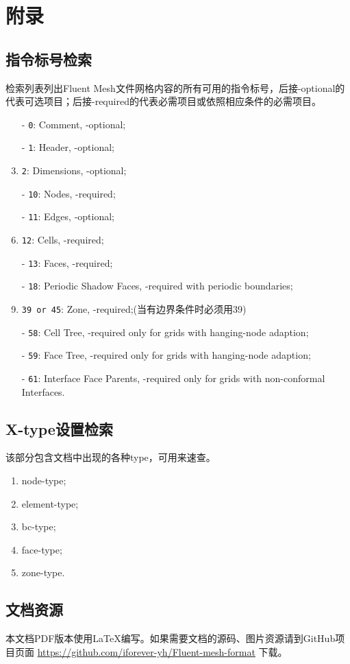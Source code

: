 \documentclass[lang=cn,11pt,a4paper]{elegantpaper} %
\begin{document}
\section{附录}

\subsection{指令标号检索}\label{index}
检索列表列出Fluent Mesh文件网格内容的所有可用的指令标号，后接-optional的代表可选项目；后接-required的代表必需项目或依照相应条件的必需项目。
\begin{enumerate}
  \item[-] \lstinline{0}: Comment, -optional;
  \item[-] \lstinline{1}: Header, -optional;
  \item[-] \lstinline{2}: Dimensions, -optional;
  \item[-] \lstinline{10}: Nodes, -required;
  \item[-] \lstinline{11}: Edges, -optional;
  \item[-] \lstinline{12}: Cells, -required;
  \item[-] \lstinline{13}: Faces, -required;
  \item[-] \lstinline{18}: Periodic Shadow Faces, -required with periodic boundaries;
  \item[-] \lstinline{39 or 45}: Zone, -required;(当有边界条件时必须用39)
  \item[-] \lstinline{58}: Cell Tree, -required only for grids with hanging-node adaption;
  \item[-] \lstinline{59}: Face Tree, -required only for grids with hanging-node adaption;
  \item[-] \lstinline{61}: Interface Face Parents, -required only for grids with non-conformal Interfaces.
\end{enumerate}

\subsection{X-type设置检索}
该部分包含文档中出现的各种type，可用来速查。
\begin{enumerate}
  \item node-type;
  \item element-type;
  \item bc-type;
  \item face-type;
  \item zone-type.
\end{enumerate}

\subsection{文档资源}
本文档PDF版本使用\LaTeX{}编写。如果需要文档的源码、图片资源请到GitHub项目页面
\url{https://github.com/iforever-yh/Fluent-mesh-format}
下载。
\end{document}
